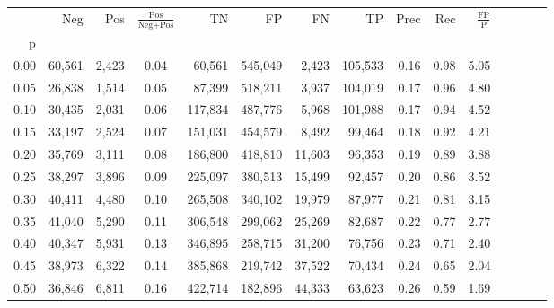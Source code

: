 \begin{tabular}{rrrcrrrrrrrrrrr}
\toprule
{} &     Neg &     Pos & $\frac{\text{Pos}}{\text{Neg}+\text{Pos}}$ &       TN &       FP &       FN &       TP &  Prec &   Rec & $\frac{\text{FP}}{\text{P}}$ \\
p    &         &         &                                            &          &          &          &          &       &       &                              \\
\midrule
0.00 &  60,561 &   2,423 &                                       0.04 &   60,561 &  545,049 &    2,423 &  105,533 &  0.16 &  0.98 &                         5.05 \\
0.05 &  26,838 &   1,514 &                                       0.05 &   87,399 &  518,211 &    3,937 &  104,019 &  0.17 &  0.96 &                         4.80 \\
0.10 &  30,435 &   2,031 &                                       0.06 &  117,834 &  487,776 &    5,968 &  101,988 &  0.17 &  0.94 &                         4.52 \\
0.15 &  33,197 &   2,524 &                                       0.07 &  151,031 &  454,579 &    8,492 &   99,464 &  0.18 &  0.92 &                         4.21 \\
0.20 &  35,769 &   3,111 &                                       0.08 &  186,800 &  418,810 &   11,603 &   96,353 &  0.19 &  0.89 &                         3.88 \\
0.25 &  38,297 &   3,896 &                                       0.09 &  225,097 &  380,513 &   15,499 &   92,457 &  0.20 &  0.86 &                         3.52 \\
0.30 &  40,411 &   4,480 &                                       0.10 &  265,508 &  340,102 &   19,979 &   87,977 &  0.21 &  0.81 &                         3.15 \\
0.35 &  41,040 &   5,290 &                                       0.11 &  306,548 &  299,062 &   25,269 &   82,687 &  0.22 &  0.77 &                         2.77 \\
0.40 &  40,347 &   5,931 &                                       0.13 &  346,895 &  258,715 &   31,200 &   76,756 &  0.23 &  0.71 &                         2.40 \\
0.45 &  38,973 &   6,322 &                                       0.14 &  385,868 &  219,742 &   37,522 &   70,434 &  0.24 &  0.65 &                         2.04 \\
0.50 &  36,846 &   6,811 &                                       0.16 &  422,714 &  182,896 &   44,333 &   63,623 &  0.26 &  0.59 &                         1.69 \\

\end{tabular}
